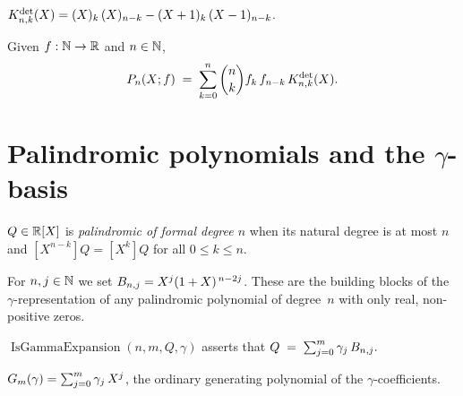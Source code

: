 \begin{definition}
  \label{def:determinantKernel}
  \leanok
  $K^{\mathrm{det}}_{n,k}(X)
    = (X)_{k}\, (X)_{n-k}
      - (X+1)_{k}\, (X-1)_{n-k}$.
\end{definition}

\begin{definition}
  \label{def:determinantPolynomial}
  \leanok
  Given $f : \mathbb{N} \to \mathbb{R}$ and $n \in \mathbb{N}$,
  \[
    P_n(X; f) \;=\; \sum_{k=0}^{n} \binom{n}{k} f_k\, f_{n-k}\, K^{\mathrm{det}}_{n,k}(X).
  \]
\end{definition}

\section{Palindromic polynomials and the \texorpdfstring{$\gamma$}{gamma}-basis}

\begin{definition}
  \label{def:PalindromicOfDegree}
  \leanok
  $Q \in \mathbb{R}[X]$ is \emph{palindromic of formal degree $n$} when its
  natural degree is at most $n$ and $[X^{n-k}]Q = [X^k]Q$ for all
  $0 \leq k \leq n$.
\end{definition}

\begin{definition}
  \label{def:gammaBasis}
  \leanok
  For $n, j \in \mathbb{N}$ we set $B_{n,j} = X^{j}(1+X)^{\,n-2j}$.
  These are the building blocks of the $\gamma$-representation of any
  palindromic polynomial of degree~$n$ with only real, non-positive
  zeros.
\end{definition}

\begin{definition}
  \label{def:IsGammaExpansion}
  \leanok
  $\operatorname{IsGammaExpansion}(n, m, Q, \gamma)$ asserts that
  \(
    Q \;=\; \sum_{j=0}^{m} \gamma_j\, B_{n,j}.
  \)
\end{definition}

\begin{definition}
  \label{def:gammaPolynomial}
  \leanok
  $G_{m}(\gamma) = \sum_{j=0}^{m} \gamma_j\, X^j$,
  the ordinary generating polynomial of the $\gamma$-coefficients.
\end{definition}

